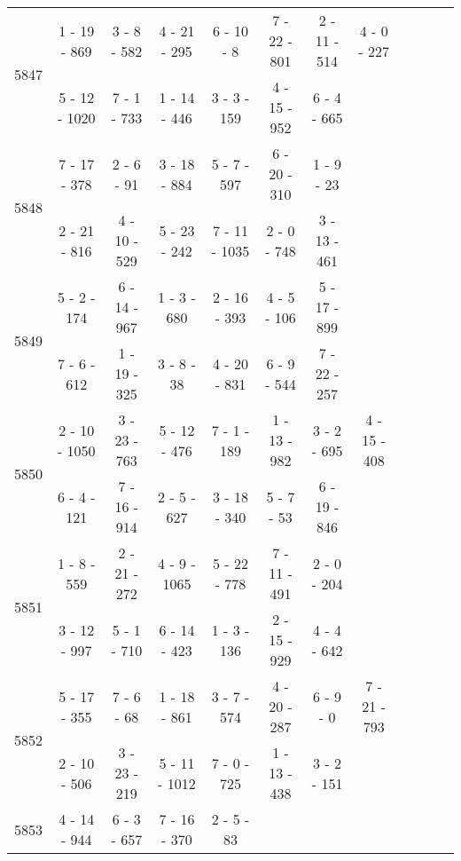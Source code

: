 \begin{longtable}{c | c | c | c | c | c | c | c | c | c | c | c}
\multirow{2}{*}{5847}
& 1 - 19 - 869
&
3 - 8 - 582
&
4 - 21 - 295
&
6 - 10 - 8
&
7 - 22 - 801
&
2 - 11 - 514
&
4 - 0 - 227
\\* \space
&
5 - 12 - 1020
&
7 - 1 - 733
&
1 - 14 - 446
&
3 - 3 - 159
&
4 - 15 - 952
&
6 - 4 - 665
&\space\\\hline
\multirow{2}{*}{5848}
& 7 - 17 - 378
&
2 - 6 - 91
&
3 - 18 - 884
&
5 - 7 - 597
&
6 - 20 - 310
&
1 - 9 - 23
&\space\\* \space
&
2 - 21 - 816
&
4 - 10 - 529
&
5 - 23 - 242
&
7 - 11 - 1035
&
2 - 0 - 748
&
3 - 13 - 461
&\space\\\hline
\multirow{2}{*}{5849}
& 5 - 2 - 174
&
6 - 14 - 967
&
1 - 3 - 680
&
2 - 16 - 393
&
4 - 5 - 106
&
5 - 17 - 899
&\space\\* \space
&
7 - 6 - 612
&
1 - 19 - 325
&
3 - 8 - 38
&
4 - 20 - 831
&
6 - 9 - 544
&
7 - 22 - 257
&\space\\\hline
\multirow{2}{*}{5850}
& 2 - 10 - 1050
&
3 - 23 - 763
&
5 - 12 - 476
&
7 - 1 - 189
&
1 - 13 - 982
&
3 - 2 - 695
&
4 - 15 - 408
\\* \space
&
6 - 4 - 121
&
7 - 16 - 914
&
2 - 5 - 627
&
3 - 18 - 340
&
5 - 7 - 53
&
6 - 19 - 846
&\space\\\hline
\multirow{2}{*}{5851}
& 1 - 8 - 559
&
2 - 21 - 272
&
4 - 9 - 1065
&
5 - 22 - 778
&
7 - 11 - 491
&
2 - 0 - 204
&\space\\* \space
&
3 - 12 - 997
&
5 - 1 - 710
&
6 - 14 - 423
&
1 - 3 - 136
&
2 - 15 - 929
&
4 - 4 - 642
&\space\\\hline
\multirow{2}{*}{5852}
& 5 - 17 - 355
&
7 - 6 - 68
&
1 - 18 - 861
&
3 - 7 - 574
&
4 - 20 - 287
&
6 - 9 - 0
&
7 - 21 - 793
\\* \space
&
2 - 10 - 506
&
3 - 23 - 219
&
5 - 11 - 1012
&
7 - 0 - 725
&
1 - 13 - 438
&
3 - 2 - 151
&\space\\\hline
\multirow{2}{*}{5853}
& 4 - 14 - 944
&
6 - 3 - 657
&
7 - 16 - 370
&
2 - 5 - 83

\end{longtable}

